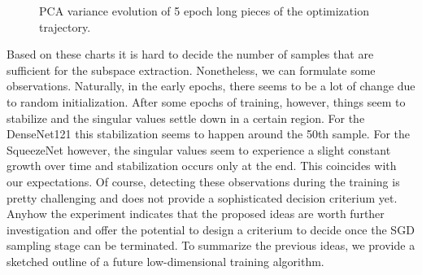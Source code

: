\documentclass[11pt, a4paper]{article}
\begin{document}
\begin{figure}[!h]
\centering
{}
\caption{\centering PCA variance evolution of 5 epoch long pieces of the optimization trajectory.}
\label{fig:sigmas}
\end{figure}

Based on these charts it is hard to decide the number of samples that are sufficient for the subspace extraction. Nonetheless, we can formulate some observations. Naturally, in the early epochs, there seems to be a lot of change due to random initialization. After some epochs of training, however, things seem to stabilize and the singular values settle down in a certain region. For the DenseNet121 this stabilization seems to happen around the 50th sample. For the SqueezeNet however, the singular values seem to experience a slight constant growth over time and stabilization occurs only at the end. This coincides with our expectations. Of course, detecting these observations during the training is pretty challenging and does not provide a sophisticated decision criterium yet. Anyhow the experiment indicates that the proposed ideas are worth further investigation and offer the potential to design a criterium to decide once the SGD sampling stage can be terminated. To summarize the previous ideas, we provide a sketched outline of a future low-dimensional training algorithm. \\
\end{document}
